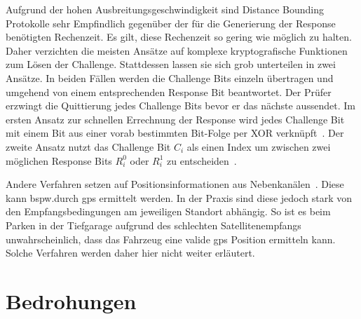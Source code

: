 Aufgrund der hohen Ausbreitungsgeschwindigkeit sind \foreignlanguage{english}{Distance Bounding} Protokolle sehr Empfindlich gegenüber der für die Generierung der \foreignlanguage{english}{Response} benötigten Rechenzeit. Es gilt, diese Rechenzeit so gering wie möglich zu halten. Daher verzichten die meisten Ansätze auf komplexe kryptografische Funktionen zum Lösen der \foreignlanguage{english}{Challenge}. Stattdessen lassen sie sich grob unterteilen in zwei Ansätze. In beiden Fällen werden die \foreignlanguage{english}{Challenge} Bits einzeln übertragen und umgehend von einem entsprechenden \foreignlanguage{english}{Response} Bit beantwortet. Der Prüfer erzwingt die Quittierung jedes \foreignlanguage{english}{Challenge} Bits bevor er das nächste aussendet. Im ersten Ansatz zur schnellen Errechnung der \foreignlanguage{english}{Response} wird jedes \foreignlanguage{english}{Challenge} Bit mit einem Bit aus einer vorab bestimmten Bit-Folge per \foreignlanguage{english}{XOR} verknüpft~\cite{Brands1994}. Der zweite Ansatz nutzt das \foreignlanguage{english}{Challenge} Bit \(C_{i}\) als einen Index um zwischen zwei möglichen \foreignlanguage{english}{Response} Bits \(R_{i}^{0}\) oder \(R_{i}^{1}\) zu entscheiden~\cite{Hancke2005}.

Andere Verfahren setzen auf Positionsinformationen aus Nebenkanälen~\cite{Wang2019}. Diese kann bspw.\@ durch \gls{gps} ermittelt werden. In der Praxis sind diese jedoch stark von den Empfangsbedingungen am jeweiligen Standort abhängig. So ist es beim Parken in der Tiefgarage aufgrund des schlechten Satellitenempfangs unwahrscheinlich, dass das Fahrzeug eine valide \gls{gps} Position ermitteln kann. Solche Verfahren werden daher hier nicht weiter erläutert.

\section{Bedrohungen}
